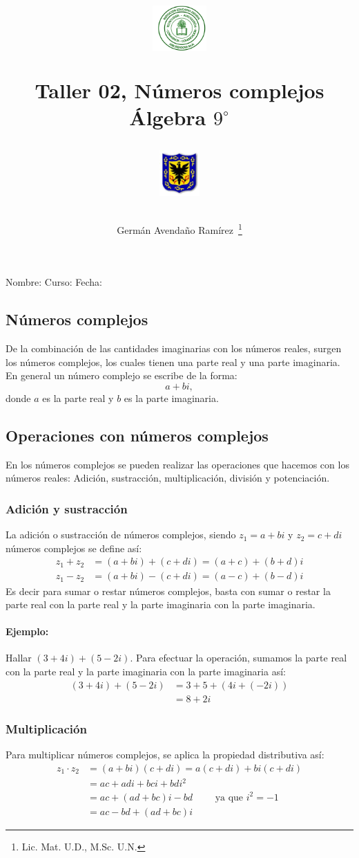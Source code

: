 \documentclass[letterpaper]{article}
\author{Germ\'an Avenda\~no Ram\'irez~\thanks{Lic. Mat. U.D., M.Sc. U.N.}}
\title{\begin{minipage}{.2\textwidth}
\includegraphics[height=1.75cm]{Images/logo-colegio.png}\end{minipage}
\begin{minipage}{.55\textwidth}
\begin{center}
Taller 02, Números complejos\\
Álgebra $9^{\circ}$
\end{center}
\end{minipage}\hfill
\begin{minipage}{.2\textwidth}
\includegraphics[height=1.75cm]{Images/logo-sed.png} 
\end{minipage}}
\date{}
\begin{document}
\maketitle
Nombre: \hrulefill Curso: \underline{\hspace{30pt}}  Fecha: \underline{\hspace{2cm}}\\

\begin{multicols}{2}
  \section{Números complejos}
  De la combinación de las cantidades imaginarias con los números reales, surgen los números complejos, los cuales tienen una parte real y una parte imaginaria. En general un número complejo se escribe de la forma:
  \[ a+bi, \] donde $ a $ es la parte real y $ b $ es la parte imaginaria.
  \subsection{Operaciones con números complejos}
  En los números complejos se pueden realizar las operaciones que hacemos con los números reales: Adición, sustracción, multiplicación, división y potenciación.
  \subsubsection{Adición y sustracción}
  La adición o sustracción de números complejos, siendo $ z_1=a+bi $ y $ z_2=c+di $ números complejos se define así:
  \begin{align*}
  z_1+z_2&=(a+bi)+(c+di)=(a+c)+(b+d)i\\
  z_1-z_2&=(a+bi)-(c+di)=(a-c)+(b-d)i
  \end{align*}
  Es decir para sumar o restar números complejos, basta con sumar o restar la parte real con la parte real y la parte imaginaria con la parte imaginaria.
  \paragraph{Ejemplo:}
  Hallar $ (3+4i)+(5-2i) $. Para efectuar la operación, sumamos la parte real con la parte real y la parte imaginaria con la parte imaginaria así:
  \begin{align*}
  (3+4i)+(5-2i)&=3+5+(4i+(-2i))\\
  &=8+2i
  \end{align*}
  \subsubsection{Multiplicación}
  Para multiplicar números complejos, se aplica la propiedad distributiva así:
\begin{align*}
    z_1\cdot z_2&=(a+bi)(c+di)=a(c+di)+bi(c+di)\\
    &=ac+adi+bci+bdi^2\\
    &=ac+(ad+bc)i-bd\qquad \text{ ya que }i^2=-1\\
    &=ac-bd+(ad+bc)i
  \end{align*}

\end{multicols}
\end{document}
